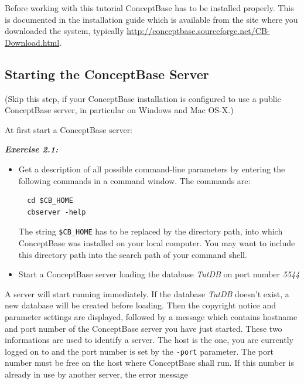 \documentclass[10pt,a4paper]{article}
\begin{document}
Before working with this tutorial ConceptBase has to be installed
properly. This is documented in the installation guide which is available from
the site where you downloaded the system, typically
\url{http://conceptbase.sourceforge.net/CB-Download.html}.

\newpage
\subsection{Starting the ConceptBase Server}

{\scriptsize
(Skip this step, if your ConceptBase installation is configured to use a
public ConceptBase server, in particular on Windows and Mac OS-X.)
}
\newline



At first start a ConceptBase server: \\

\vspace{0.2cm}
{\it
{\bf Exercise 2.1:}
\begin{itemize}
\item[a)] Get a description of all possible command-line parameters
by entering the following commands in a command window. The commands are:
\begin{verbatim}
  cd $CB_HOME
  cbserver -help
\end{verbatim}


The string {\tt \$CB\_HOME} has to be replaced by the directory path,
into which ConceptBase was installed on your local computer. You may want
to include this directory path into the search path of your command shell.

\item[b)] Start a ConceptBase server loading the
   database {\em TutDB} on port number {\em 5544}
\end{itemize}
}


A server will start running immediately. If the database {\em TutDB}
doesn't exist, a new database will be created before loading. Then
the copyright notice and parameter settings are displayed, followed
by a message which contains hostname and port number of the ConceptBase
server you have just started. These two informations are used to
identify a server. The host is the one, you are currently logged on to
and the port number is set by the {\tt -port} parameter. The port number
must be free on the host where ConceptBase shall run.
If this number is already in use by another server, the error message \\
\end{document}

